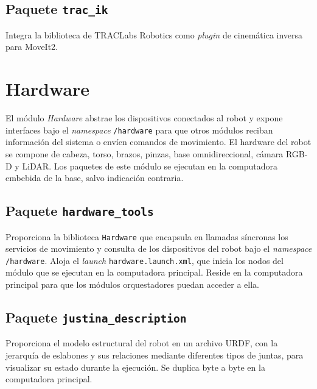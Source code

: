 \subsection{Paquete \texttt{trac\_ik}}
Integra la biblioteca de TRACLabs Robotics como \textit{plugin} de cinemática inversa para MoveIt2.


\section[Hardware]{Hardware}
\label{app:justina_hardware}

El módulo \textit{Hardware} abstrae los dispositivos conectados al robot y expone interfaces bajo el \textit{namespace} \texttt{/hardware} para que otros módulos reciban información del sistema o envíen comandos de movimiento. El hardware del robot se compone de cabeza, torso, brazos, pinzas, base omnidireccional, cámara RGB-D y LiDAR. Los paquetes de este módulo se ejecutan en la computadora embebida de la base, salvo indicación contraria.

\subsection{Paquete \texttt{hardware\_tools}}

Proporciona la biblioteca \texttt{Hardware} que encapsula en llamadas síncronas los servicios de movimiento y consulta de los dispositivos del robot bajo el \textit{namespace} \texttt{/hardware}. Aloja el \textit{launch} \texttt{hardware.launch.xml}, que inicia los nodos del módulo que se ejecutan en la computadora principal. Reside en la computadora principal para que los módulos orquestadores puedan acceder a ella.

\subsection{Paquete \texttt{justina\_description}}

Proporciona el modelo estructural del robot en un archivo URDF, con la jerarquía de eslabones y sus relaciones mediante diferentes tipos de juntas, para visualizar su estado durante la ejecución. Se duplica byte a byte en la computadora principal.

